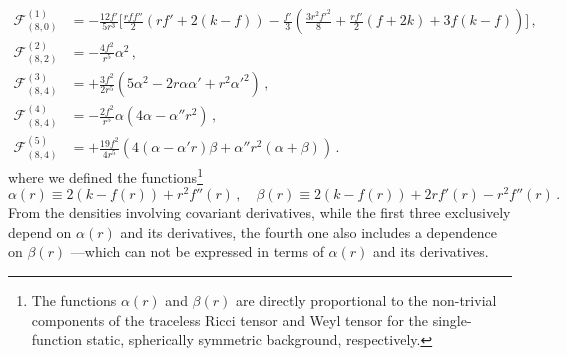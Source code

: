 \documentclass[11pt]{article}
\begin{document}
{%
\begin{align}
\mathcal{F}_{(8,0)}^{(1)} &= - \frac{12 f'}{5r^3} \bigg[ \frac{r f f''}{2} \left(r f' + 2 (k-f) \right) - \frac{f'}{3} \left(\frac{3 r^2 f'^2}{8} +  \frac{r f'}{2} (f + 2k) + 3 f (k-f) \right) \bigg]\, ,
\\
\mathcal{F}_{(8,2)}^{(2)} &= -\frac{4 f^2}{r^5} \alpha^2 \, ,
\\
\mathcal{F}_{(8,4)}^{(3)} &=+ \frac{3 f^2}{2 r^5} (5 \alpha^2-2r  \alpha \alpha'+r^2 \alpha'^2) \, ,
\\
\mathcal{F}_{(8,4)}^{(4)} &= - \frac{2 f^2}{r^5} \alpha (4 \alpha-\alpha'' r^2) \, ,
\\
\mathcal{F}_{(8,4)}^{(5)} &= +\frac{19 f^2}{4r^5} (4(\alpha-\alpha' r )\beta+\alpha'' r^2 (\alpha+\beta))\,.
\end{align}
where we defined the functions\footnote{The functions $\alpha(r)$ and $\beta(r)$ are directly proportional to the non-trivial components of the traceless Ricci tensor and Weyl tensor for the single-function static, spherically symmetric background, respectively.}
\begin{equation}
\alpha(r)\equiv 2(k-f(r))+r^2 f''(r)\, , \quad \beta(r)\equiv 2(k-f(r))+2rf'(r)-r^2 f''(r)\, .
\end{equation}
From the densities involving covariant derivatives, while the first three exclusively depend on $\alpha(r)$ and its derivatives, the fourth one also includes a dependence on $\beta(r)$ ---which can not be expressed in terms of $\alpha(r)$ and its derivatives.

}
\end{document}
